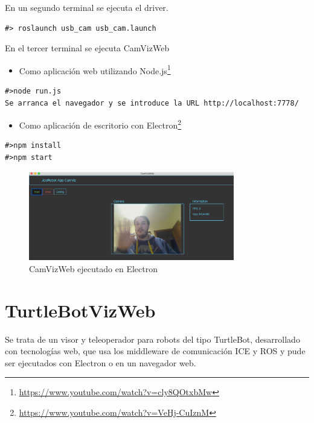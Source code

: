 En un segundo terminal se ejecuta el driver.

\begin{lstlisting}[caption= Ejecución del driver de ROS label=cod.driverusbcam]
#> roslaunch usb_cam usb_cam.launch
\end{lstlisting}

En el tercer terminal se ejecuta CamVizWeb

\begin{itemize}
\item 
Como aplicación web utilizando Node.js\footnote{\url{https://www.youtube.com/watch?v=cly8QOtxbMw}}
\end{itemize}

\begin{lstlisting}[caption= Ejecución con Node.js, label=cod.camviznodejs]
#>node run.js
Se arranca el navegador y se introduce la URL http://localhost:7778/
\end{lstlisting}

\begin{itemize}
\item 
Como aplicación de escritorio con Electron\footnote{\url{https://www.youtube.com/watch?v=VeHj-CuIznM}}
\end{itemize}

\begin{lstlisting}[caption= Ejecución con Electron, label=cod.camvizelectron]
#>npm install
#>npm start
\end{lstlisting}

\begin{figure}[H]
  \begin{center}
    \includegraphics[width=0.8\textwidth]{figures/camvizelectron.png}
    		\caption{CamVizWeb ejecutado en Electron}
		\label{fig.camvizelectron}
		\end{center}
\end{figure}

\section{TurtleBotVizWeb}
Se trata de un visor y teleoperador para robots del tipo TurtleBot, desarrollado con tecnologías web, que usa los middleware de comunicación ICE y ROS y pude ser ejecutados con Electron o en un navegador web.

